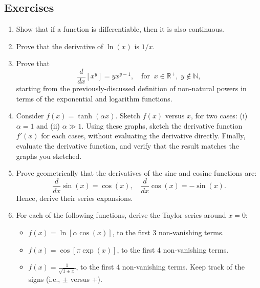 \documentclass[10pt,a4paper]{article}
\begin{document}
\subsection{Exercises}\label{exercises}

\begin{enumerate}
\item 
Show that if a function is differentiable, then it is also continuous.

\item
Prove that the derivative of $\ln(x)$ is $1/x$.

\item
  Prove that
\begin{equation}
\frac{d}{dx} [x^y] = y x^{y-1}, \quad\mathrm{for}\;\;x \in \mathbb{R}^+, \; y \notin \mathbb{N},
\end{equation}
starting from the previously-discussed definition of non-natural
powers in terms of the exponential and logarithm functions.

\item
  Consider $f(x) = \tanh(\alpha x)$.  Sketch $f(x)$ versus $x$, for
  two cases: (i) $\alpha = 1$ and (ii) $\alpha \gg 1$.  Using these
  graphs, sketch the derivative function $f'(x)$ for each cases,
  without evaluating the derivative directly.  Finally, evaluate the
  derivative function, and verify that the result matches the graphs
  you sketched.

\item
  Prove geometrically that the derivatives of the sine and cosine
  functions are:
  \begin{equation}
    \frac{d}{dx}\sin(x) = \cos(x),
    \quad\frac{d}{dx}\cos(x) = -\sin(x).
  \end{equation}
  Hence, derive their series expansions.

\item
  For each of the following functions, derive the Taylor series around
$x = 0$:
\begin{itemize}
\item $f(x) = \ln\left[\alpha \cos(x)\right]$, to the first 3 non-vanishing
  terms.

\item $f(x) = \cos\left[\pi\exp(x)\right]$, to the first 4 non-vanishing
  terms.

\item $f(x) = \frac{1}{\sqrt{1 \pm x}}$, to the first 4 non-vanishing terms.
Keep track of the signs (i.e., $\pm$ versus $\mp$).
\end{itemize}


\end{enumerate}
\end{document}
